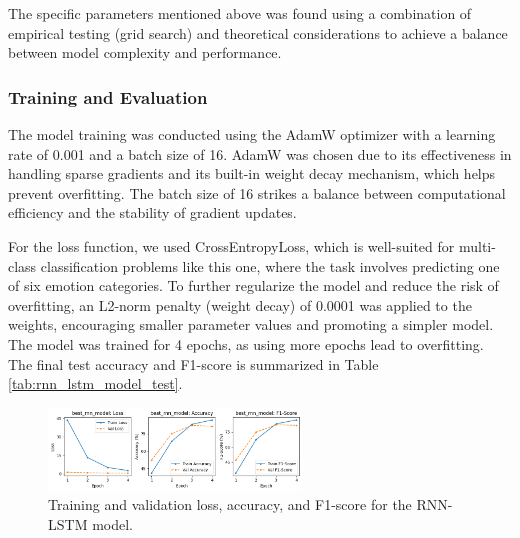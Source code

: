 The specific parameters mentioned above was found using a combination of empirical testing (grid search) and theoretical considerations to achieve a balance between model complexity and performance.

\subsubsection{Training and Evaluation}
The model training was conducted using the AdamW optimizer with a learning rate of 0.001 and a batch size of 16. AdamW was chosen due to its effectiveness in handling sparse gradients and its built-in weight decay mechanism, which helps prevent overfitting. The batch size of 16 strikes a balance between computational efficiency and the stability of gradient updates.

For the loss function, we used CrossEntropyLoss, which is well-suited for multi-class classification problems like this one, where the task involves predicting one of six emotion categories. To further regularize the model and reduce the risk of overfitting, an L2-norm penalty (weight decay) of 0.0001 was applied to the weights, encouraging smaller parameter values and promoting a simpler model. The model was trained for 4 epochs, as using more epochs lead to overfitting. The final test accuracy and F1-score is summarized in Table \ref{tab:rnn_lstm_model_test}.
\begin{figure}[H]
    \vspace*{0.7cm}
    \centering
    \includegraphics[width=0.6\textwidth]{figures/rnn_scores.png}
    \caption{Training and validation loss, accuracy, and F1-score for the RNN-LSTM model.}
    \label{fig:rnn_scores}
    \vspace*{0.7cm}
\end{figure}

